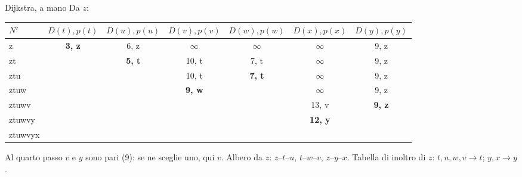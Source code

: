 \begin{esercizio}{Dijkstra, a mano}
Da $z$:
\begin{center}
\small
\begin{tabular}{lcccccc}
\toprule
$N'$ & $D(t),p(t)$ & $D(u),p(u)$ & $D(v),p(v)$ & $D(w),p(w)$ & $D(x),p(x)$ & $D(y),p(y)$ \\
\midrule
z & \textbf{3, z} & 6, z & $\infty$ & $\infty$ & $\infty$ & 9, z \\
zt & & \textbf{5, t} & 10, t & 7, t & $\infty$ & 9, z \\
ztu & & & 10, t & \textbf{7, t} & $\infty$ & 9, z \\
ztuw & & & \textbf{9, w} & & $\infty$ & 9, z \\
ztuwv & & & & & 13, v & \textbf{9, z} \\
ztuwvy & & & & & \textbf{12, y} & \\
ztuwvyx & & & & & & \\
\bottomrule
\end{tabular}
\end{center}
Al quarto passo $v$ e $y$ sono pari (9): se ne sceglie uno, qui $v$. Albero da $z$: $z$--$t$--$u$, $t$--$w$--$v$, $z$--$y$--$x$. Tabella di
inoltro di $z$: $t, u, w, v \rightarrow t$; $y, x \rightarrow y$.
\end{esercizio}

